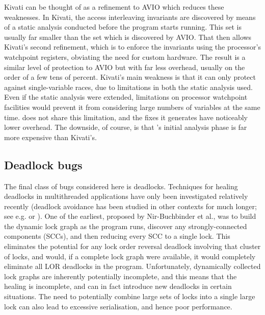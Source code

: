 Kivati\cite{Chew2010} can be thought of as a refinement to AVIO which
reduces these weaknesses.  In Kivati, the access interleaving
invariants are discovered by means of a static analysis conducted
before the program starts running.  This set is usually far smaller
than the set which is discovered by AVIO.  That then allows Kivati's
second refinement, which is to enforce the invariants using the
processor's watchpoint registers\needCite{}, obviating the need for
custom hardware.  The result is a similar level of protection to AVIO
but with far less overhead, usually on the order of a few tens of
percent.  Kivati's main weakness is that it can only protect against
single-variable races, due to limitations in both the static analysis
used.  Even if the static analysis were extended, limitations on
processor watchpoint facilities would prevent it from considering
large numbers of variables at the same time.  {\Technique} does not
share this limitation, and the fixes it generates have noticeably
lower overhead.  The downside, of course, is that {\technique}'s
initial analysis phase is far more expensive than Kivati's.

\subsection{Deadlock bugs}
The final class of bugs considered here is deadlocks.  Techniques for
healing deadlocks in multithreaded applications have only been
investigated relatively recently (deadlock avoidance has been studied
in other contexts for much longer; see e.g. \cite{Viswanadham1990} or
\cite{Dijkstra2004}).  One of the earliest, proposed by Nir-Buchbinder
et al.\cite{Nir-Buchbinder2008}, was to build the dynamic lock graph
as the program runs, discover any strongly-connected components
(SCCs), and then reducing every SCC to a single lock.  This eliminates
the potential for any lock order reversal deadlock involving that
cluster of locks, and would, if a complete lock graph were available,
it would completely eliminate all LOR deadlocks in the program.
Unfortunately, dynamically collected lock graphs are inherently
potentially incomplete, and this means that the healing is incomplete,
and can in fact introduce new deadlocks in certain situations.  The
need to potentially combine large sets of locks into a single large
lock can also lead to excessive serialisation, and hence poor
performance.

